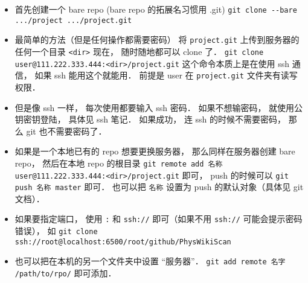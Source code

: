 
\begin{issues}
\issueDraft
\end{issues}


\begin{itemize}
\item 首先创建一个 bare repo (bare repo 的拓展名习惯用 .git)
\verb|git clone --bare .../project .../project.git|

\item 最简单的方法（但是任何操作都需要密码）
将 \verb|project.git| 上传到服务器的任何一个目录 \verb|<dir>|
现在， 随时随地都可以 clone 了．
\verb`git clone user@111.222.333.444:<dir>/project.git`
这个命令本质上是在使用 ssh 通信， 如果 ssh 能用这个就能用．
前提是 user 在 \verb|project.git| 文件夹有读写权限．

\item 但是像 ssh 一样， 每次使用都要输入 ssh 密码． 如果不想输密码， 就使用公钥密钥登陆， 具体见 ssh 笔记． 如果成功， 连 ssh 的时候不需要密码， 那么 git 也不需要密码了．

\item 如果是一个本地已有的 repo 想要更换服务器， 那么同样在服务器创建 bare repo， 然后在本地 repo 的根目录 \verb`git remote add 名称 user@111.222.333.444:<dir>/project.git` 即可， push 的时候可以 \verb`git push 名称 master` 即可． 也可以把 \verb`名称` 设置为 push 的默认对象（具体见 git 文档）．

\item 如果要指定端口， 使用 \verb`:` 和 \verb`ssh://` 即可（如果不用 \verb`ssh://` 可能会提示密码错误）， 如 \verb`git clone ssh://root@localhost:6500/root/github/PhysWikiScan`

\item 也可以把在本机的另一个文件夹中设置 “服务器”． \verb|git add remote 名字 /path/to/rpo/| 即可添加．
\end{itemize}
